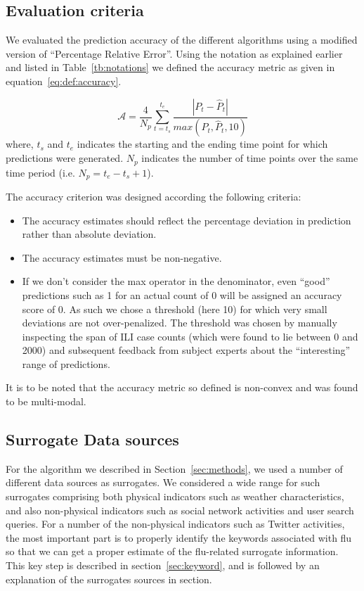 \subsection{Evaluation criteria}
 We evaluated the prediction accuracy of the
different algorithms using a modified version of ``Percentage Relative Error''.
Using the notation as explained earlier and listed in Table~\ref{tb:notations}
we defined the accuracy metric as given in equation~\ref{eq:def:accuracy}.

\begin{equation} 
    \label{eq:def:accuracy} 
    \mathcal{A} = \frac{4}{N_p}\sum \limits_{t=t_s}^{t_e}\frac{|P_t -\hat{P}_t| }{max(P_t, \hat{P}_t, 10)}
\end{equation} 
where, $t_s$ and $t_e$ indicates the starting and the ending
time point for which predictions were generated.  $N_p$ indicates the number of
time points over the same time period (i.e. $N_p = t_e - t_s + 1$). 

The accuracy criterion was designed according the following criteria:
\begin{itemize} 
    \item 
    The accuracy estimates should reflect the percentage
    deviation in prediction rather than absolute deviation. 
\item The accuracy estimates must be non-negative.  \item If we
don't consider the max operator in the denominator, even ``good'' predictions
such as 1 for an actual count of 0 will be assigned an accuracy score of 0. As
such we chose a threshold (here 10) for which very small deviations are not
over-penalized. The threshold was chosen by manually inspecting the span of ILI
case counts (which were found to lie between 0 and 2000) and subsequent
feedback from subject experts about the ``interesting'' range of predictions.
\end{itemize} 
It is to be noted that the accuracy metric so defined is
non-convex and was found to be multi-modal. 


\subsection{Surrogate Data sources}
For the algorithm we described in Section~\ref{sec:methods},
we used a number of different data sources as
surrogates. We considered a wide range for such surrogates comprising both
physical indicators such as weather characteristics, and also non-physical
indicators such as social network activities and user search queries.  For a
number of the non-physical indicators such as Twitter activities, the most
important part is to properly identify the keywords associated with flu so that
we can get a proper estimate of the flu-related surrogate information. This key
step is described in section~\ref{sec:keyword}, and is followed by an
explanation of the surrogates sources in section. 

